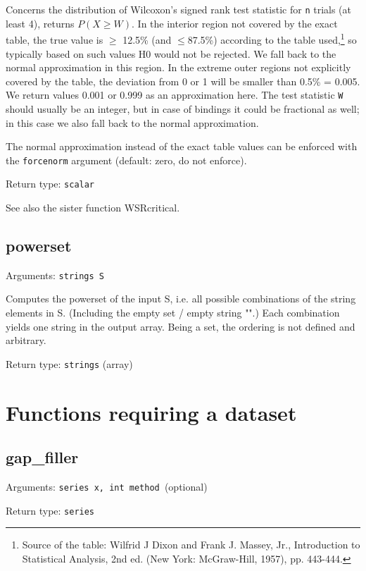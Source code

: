 \documentclass[11pt,english]{article}
\begin{document}
Concerns the distribution of Wilcoxon's signed rank test statistic for
\texttt{n} trials (at least 4), returns $P(X\geq W)$. In the interior
region not covered by the exact table, the true value is $\geq$ 12.5\%
(and $\leq$87.5\%) according to the table used,\footnote{Source of the
  table: Wilfrid J Dixon and Frank J. Massey, Jr., Introduction to
  Statistical Analysis, 2nd ed. (New York: McGraw-Hill, 1957), pp.
  443-444.} so typically based on such values H0 would not be
rejected. We fall back to the normal approximation in this region. In
the extreme outer regions not explicitly covered by the table, the
deviation from 0 or 1 will be smaller than 0.5\% = 0.005. We return
values 0.001 or 0.999 as an approximation here. The test statistic
\texttt{W} should usually be an integer, but in case of bindings it
could be fractional as well; in this case we also fall back to the
normal approximation.

The normal approximation instead of the exact table values can be
enforced with the \texttt{forcenorm} argument (default: zero, do not
enforce).

\noindent Return type: \texttt{scalar}

See also the sister function WSRcritical.

\subsection{powerset}

Arguments: \texttt{strings S}

Computes the powerset of the input S, i.e. all possible combinations 
of the string elements in S. (Including the empty set / 
empty string "".) Each combination yields one string in the output 
array. Being a set, the ordering is not defined and arbitrary. 

\noindent Return type: \texttt{strings} (array)

\section{Functions requiring a dataset}

\subsection{gap\_filler}

Arguments: \texttt{series x, int method }(optional)\texttt{ }

\noindent Return type: \texttt{series}
\end{document}
